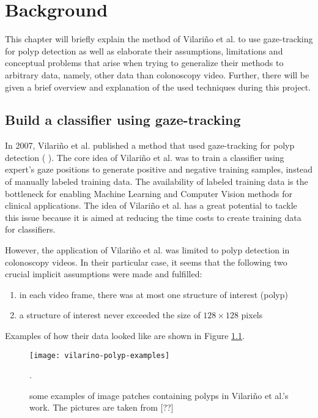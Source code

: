 \chapter{Background}
\label{chap:background}
This chapter will briefly explain the method of Vilari\~no et al. to use gaze-tracking for polyp detection as well as elaborate their assumptions, limitations and conceptual problems that arise when trying to generalize their methods to arbitrary data, namely, other data than colonoscopy video. Further, there will be given a brief overview and explanation of the used techniques during this project.


\section{Build a classifier using gaze-tracking}
In 2007, Vilari\~no et al. published a method that used gaze-tracking for polyp detection ( ). The core idea of Vilari\~no et al. was to train a classifier using expert's gaze positions to generate positive and negative training samples, instead of manually labeled training data. 
The availability of labeled training data is the bottleneck for enabling Machine Learning and Computer Vision methods for clinical applications. 
The idea of Vilari\~no et al. has a great potential to tackle this issue because it is aimed at reducing the time costs to create training data for classifiers. 

However, the application of Vilari\~no et al. was limited to polyp detection in colonoscopy videos. In their particular case, it seems that the following two crucial implicit assumptions were made and fulfilled:
\begin{enumerate}
 \item in each video frame, there was at most one structure of interest (polyp)
 \item a structure of interest never exceeded the size of $128 \times 128$ pixels
\end{enumerate}
Examples of how their data looked like are shown in Figure \ref{fig:vilarinoPolypExamples}.

\begin{figure}[ht]
	\centering
	\texttt{[image: vilarino-polyp-examples]}
	\caption{some examples of image patches containing polyps in Vilari\~no et al.'s work. The pictures are taken from [??]}.
	\label{fig:vilarinoPolypExamples}
\end{figure}

